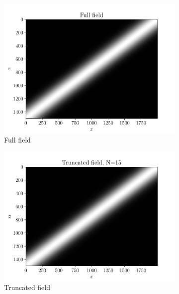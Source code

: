 \begin{figure}
\begin{subfigure}[t]{0.5\linewidth}
    \centering
    \includegraphics[width=\linewidth]{Figures/FullField_Gauss.pdf}
    \caption{Full field}
\end{subfigure}
  \begin{subfigure}[t]{0.5\linewidth}
    \centering
    \includegraphics[width=\linewidth]{Figures/TruncatedField_15_Gauss.pdf}
    \caption{Truncated field}
\end{subfigure}  
  \begin{subfigure}[t]{0.5\linewidth}
    \centering

\end{subfigure}
\end{figure}
